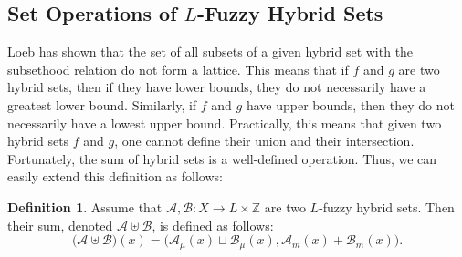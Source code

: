 \documentclass{amsart}
\theoremstyle{definition}
\newtheorem{definition}[theorem]{Definition}
\begin{document}
\subsection{Set Operations of $L$-Fuzzy Hybrid Sets}
Loeb has shown that the set of all subsets of a given hybrid set with the subsethood 
relation do not form a lattice. This means that if
$f$ and $g$ are two hybrid sets, then if they have lower bounds, they do not necessarily
have a greatest lower bound. Similarly, if $f$ and $g$ have upper bounds, then they do not
necessarily have a lowest upper bound. Practically, this means that given two hybrid sets
$f$ and $g$, one cannot define their union and their intersection. Fortunately, the sum
of hybrid sets is a well-defined operation. Thus, we can easily extend this definition
as follows:
\begin{definition}
Assume that $\mathscr{A},\mathscr{B}:X\rightarrow L\times\mathbb{Z}$ 
are two $L$-fuzzy hybrid sets. Then their sum, denoted 
$\mathscr{A}\uplus\mathscr{B}$, is defined as follows:
\begin{displaymath}
\bigl(\mathscr{A}\uplus\mathscr{B}\bigr)(x)=\biggl(\mathscr{A}_{\mu}(x)
                                                 \sqcup\mathscr{B}_{\mu}(x),
                                                 \mathscr{A}_{m}(x) + \mathscr{B}_{m}(x)
                                           \biggr).
\end{displaymath}
\end{definition}
\end{document}
